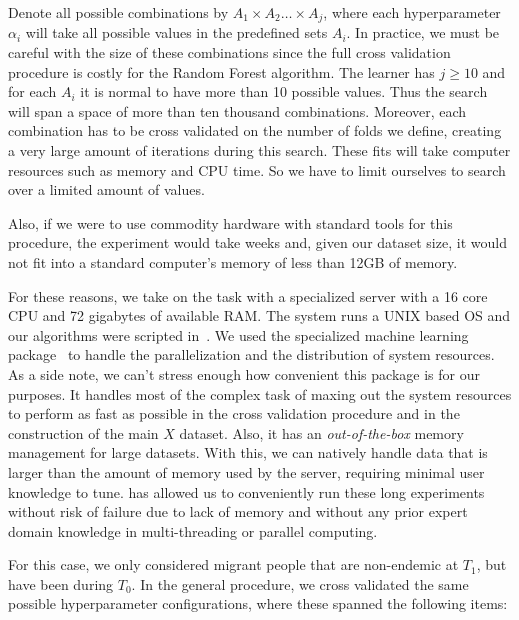 Denote all possible combinations by $A_1 \times A_2 \ldots \times  A_j$, where each hyperparameter $\alpha_i$ will take all possible values in the predefined sets $A_i$.
In practice, we must be careful with the size of these combinations since the full cross validation procedure is costly for the Random Forest algorithm.
The learner has $j \geq 10$ and for each $A_i$ it is normal to have more than 10 possible values.
Thus the search will span a space of more than ten thousand combinations.
Moreover, each combination has to be cross validated on the number of folds we define, creating a very large amount of iterations during this search.
These fits will take computer resources such as memory and CPU time.
So we have to limit ourselves to search over a limited amount of values.

Also, if we were to use commodity hardware with standard tools for this procedure, the experiment would take weeks and, given our dataset size, it would not fit into a standard computer's memory of less than 12GB of memory.

For these reasons, we take on the task with a specialized server with a 16 core CPU and 72 gigabytes of available RAM.\@
The system runs a UNIX based OS and our algorithms were scripted in~\cite{python3.5}.
We used the specialized machine learning package~\cite{graphlab} to handle the parallelization and the distribution of system resources.
As a side note, we can't stress enough how convenient this package is for our purposes.
It handles most of the complex task of maxing out the system resources to perform as fast as possible in the cross validation procedure and in the construction of the main $X$ dataset.
Also, it has an \textit{out-of-the-box} memory management for large datasets.
With this, we can natively handle data that is larger than the amount of memory used by the server, requiring minimal user knowledge to tune.
\cite{graphlab} has allowed us to conveniently run these long experiments without risk of failure due to lack of memory and without any prior expert domain knowledge in multi-threading or parallel computing.

For this case, we only considered migrant people that are non-endemic at $T_1$, but have been during $T_0$.
In the general procedure, we cross validated the same possible hyperparameter configurations, where these spanned the following items:

